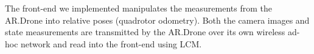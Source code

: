 \documentclass[conference]{IEEEtran}
\begin{document}

The front-end we implemented manipulates the measurements from the AR.Drone into relative poses 
(quadrotor odometry). Both the camera images and state measurements are transmitted by the AR.Drone 
over its own wireless ad-hoc network and read into the front-end using LCM.
\end{document}

